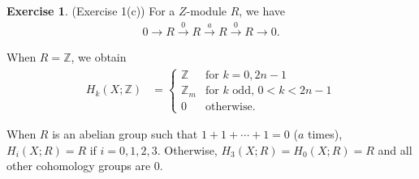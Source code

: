 \documentclass[12pt, psamsfonts]{amsart}
\theoremstyle{definition}
\newtheorem*{exer}{Exercise}
\theoremstyle{remark}
\numberwithin{equation}{section}
\begin{document}
\begin{exer}{(Exercise 1(c))}
  For a $Z$-module $R$, we have
  \begin{align*}
    0 \rightarrow R \xrightarrow{0} R \xrightarrow{a} R \xrightarrow{0} R \rightarrow 0.
  \end{align*}

  When $R = \mathbb{Z}$, we obtain
  \begin{align*}
    H_k(X; \mathbb{Z}) &= \begin{cases}
      \mathbb{Z} & \text{for $k = 0, 2n - 1$} \\
      \mathbb{Z}_m & \text{for $k$ odd, $0 < k < 2n - 1$} \\
      0 & \text{otherwise}.
    \end{cases}
  \end{align*}

  When $R$ is an abelian group such that $1 + 1 + \cdots + 1 = 0$ ($a$ times), $H_i(X; R) = R$ if $i = 0, 1, 2, 3$.
  Otherwise, $H_3(X; R) = H_0(X; R) = R$ and all other cohomology groups are 0.
\end{exer}
\end{document}
